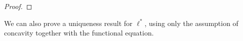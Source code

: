 \documentclass[letterpaper,11pt]{article}
\begin{document}
\begin{proof}
\begin{comment}
Since each $A_k(x)$ is an honest Laurent series around $0$, if $A_k(x) - A_{k+1}(x)$ is \emph{not} $O(x^{k-2})$, then we must have $A_k(x) - A_{k+1}(x) = \Omega(x^{k-3})$ as $x$ approaches $0$. Since
\[
A_{k+1}(x) - A_k(x) = \ell^*[x,x,\ell(x),...,\ell^k(x)]\prod_{i=1}^k(x-\ell^i(x)) - \ell^*[x,x,\ell(x),...,\ell^{k+1}(x)]\prod_{i=1}^{k+1}(x-\ell^i(x))
\]
and $x - \ell^i(x) \propto x^2$ for each $i$, we see that if $A_k(x) - A_{k+1}(x) = \Omega(x^{k-3})$, then
\[
\max\Big(\big|\ell^*[x,x,\ell(x),...,\ell^k(x)]\big|x^{2k}, \big|\ell^*[x,x,\ell(x),...,\ell^{k+1}(x)]\big|x^{2k+2}\Big) = \Omega(x^{k-3}).
\]
By the mean value theorem for divided differences and the fact that $\ell^*$ is completely monotone, this implies that at each $x$ either ${\ell^*}^{(k+1)}(x) = \Omega(x^{-k-3})$ or ${\ell^*}^{(k+2)}(x) = \Omega(x^{-k-5})$. By complete monotonicity again, we see that if ${\ell^*}^{(k+2)}(x) = \Omega(x^{-k-5})$ then ${\ell^*}^{(k+1)}(x/2) = \Omega(x^{-k-4})$, so we must in fact have
\[
{\ell^*}^{(k+1)}(x) = \Omega(x^{-k-3})
\]
for all sufficiently small $x$. But then integrating this repeatedly gives $\ell^*(x) = \Omega(x^{-2})$, which contradicts $\ell^n(1) \propto 1/n$. This contradiction proves that we must in fact have
\[
{\ell^*}'(x) = A_k(x) + O(x^{k-2})
\]
for all $k$.
\end{comment}
\end{proof}

We can also prove a uniqueness result for $\ell^*$, using only the assumption of concavity together with the functional equation.

\begin{comment}
\begin{prop}[\cite{completely-monotone-uniqueness}] If $f, g$ are completely monotone and $f(x_n) = g(x_n)$ for a sequence $x_n$ such that $\sum_n 1/x_n$ diverges, then $f = g$. The same holds for functions with completely monotone derivatives. %
\end{prop}

\begin{cor} If $f$ is a function with a completely monotone derivative which satisfies $f(\ell^n(1)) = -n$ for all $n \in \NN$, then $f = \ell^*$.
\end{cor}
\end{comment}
\end{document}
